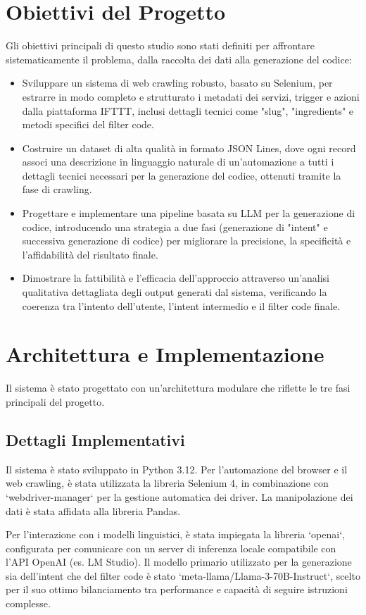 \documentclass[sigconf,natbib=false]{acmart}
\begin{document}
\section{Obiettivi del Progetto}
Gli obiettivi principali di questo studio sono stati definiti per affrontare sistematicamente il problema, dalla raccolta dei dati alla generazione del codice:
\begin{itemize}
  \item Sviluppare un sistema di web crawling robusto, basato su Selenium, per estrarre in modo completo e strutturato i metadati dei servizi, trigger e azioni dalla piattaforma IFTTT, inclusi dettagli tecnici come "slug", "ingredients" e metodi specifici del filter code.
  \item Costruire un dataset di alta qualità in formato JSON Lines, dove ogni record associ una descrizione in linguaggio naturale di un'automazione a tutti i dettagli tecnici necessari per la generazione del codice, ottenuti tramite la fase di crawling.
  \item Progettare e implementare una pipeline basata su LLM per la generazione di codice, introducendo una strategia a due fasi (generazione di "intent" e successiva generazione di codice) per migliorare la precisione, la specificità e l'affidabilità del risultato finale.
  \item Dimostrare la fattibilità e l'efficacia dell'approccio attraverso un'analisi qualitativa dettagliata degli output generati dal sistema, verificando la coerenza tra l'intento dell'utente, l'intent intermedio e il filter code finale.
\end{itemize}

\section{Architettura e Implementazione}
Il sistema è stato progettato con un'architettura modulare che riflette le tre fasi principali del progetto.

\subsection{Dettagli Implementativi}
Il sistema è stato sviluppato in Python 3.12. Per l'automazione del browser e il web crawling, è stata utilizzata la libreria Selenium 4, in combinazione con `webdriver-manager` per la gestione automatica dei driver. La manipolazione dei dati è stata affidata alla libreria Pandas.

Per l'interazione con i modelli linguistici, è stata impiegata la libreria `openai`, configurata per comunicare con un server di inferenza locale compatibile con l'API OpenAI (es. LM Studio). Il modello primario utilizzato per la generazione sia dell'intent che del filter code è stato `meta-llama/Llama-3-70B-Instruct`, scelto per il suo ottimo bilanciamento tra performance e capacità di seguire istruzioni complesse.
\end{document}
